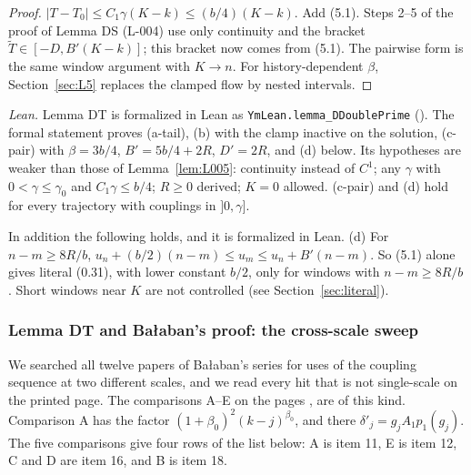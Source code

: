 \begin{proof}
$|T-T_0|\le C_1\gamma(K-k)\le(b/4)(K-k)$. Add (5.1). Steps 2--5 of the proof of Lemma DS (L-004) use only continuity and the bracket $\tilde T\in[-D,B'(K-k)]$; this bracket now comes from (5.1). The pairwise form is the same window argument with $K\to n$. For history-dependent $\beta$, Section~\ref{sec:L5} replaces the clamped flow by nested intervals.
\end{proof}

\emph{Lean.} Lemma DT is formalized in Lean as \texttt{YmLean.lemma\_DDoublePrime} (). The formal statement proves (a-tail), (b) with the clamp inactive on the solution, (c-pair) with $\beta=3b/4$, $B'=5b/4+2R$, $D'=2R$, and (d) below. Its hypotheses are weaker than those of Lemma~\ref{lem:L005}: continuity instead of $C^1$; any $\gamma$ with $0<\gamma\le\gamma_0$ and $C_1\gamma\le b/4$; $R\ge0$ derived; $K=0$ allowed. (c-pair) and (d) hold for every trajectory with couplings in $]0,\gamma]$.

In addition the following holds, and it is formalized in Lean. (d) For $n-m\ge8R/b$, $u_n+(b/2)(n-m)\le u_m\le u_n+B'(n-m)$. So (5.1) alone gives literal (0.31), with lower constant $b/2$, only for windows with $n-m\ge8R/b$. Short windows near $K$ are not controlled (see Section~\ref{sec:literal}).

\subsubsection{Lemma DT and Ba{\l}aban's proof: the cross-scale sweep}\label{sec:sweep}

We searched all twelve papers of Ba{\l}aban's series for uses of the coupling sequence at two different scales, and we read every hit that is not single-scale on the printed page. The comparisons A--E on the pages \cite[p.~192, p.~198 (1.94)]{balaban122a}, \cite[p.~381 (twice), p.~386]{balaban122b} are of this kind. Comparison A has the factor $(1+\beta_0)^2(k-j)^{\beta_0}$, and there $\delta'_j = g_jA_1p_1(g_j)$. The five comparisons give four rows of the list below: A is item 11, E is item 12, C and D are item 16, and B is item 18.

